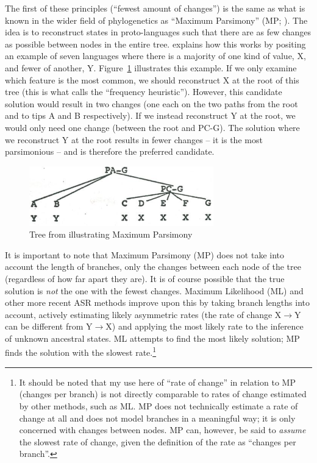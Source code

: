 \documentclass[12pt,letterpaper]{article}
\begin{document}
The first of these principles (``fewest amount of changes'') is the same as what is known in the wider field of phylogenetics as ``Maximum Parsimony'' (MP; \citealt{felsenstein2004inferring}). The idea is to reconstruct states in proto-languages such that there are as few changes as possible between nodes in the entire tree. \citet[17--22]{clark1973aspects} explains how this works by positing an example of seven languages where there is a majority of one kind of value, X, and fewer of another, Y. Figure~\ref{fig:clark_tree} illustrates this example. If we only examine which feature is the most common, we should reconstruct X at the root of this tree (this is what \citealt{goldstein_2022} calls the ``frequency heuristic''). However, this candidate solution would result in two changes (one each on the two paths from the root and to tips A and B respectively). If we instead reconstruct Y at the root, we would only need one change (between the root and PC-G). The solution where we reconstruct Y at the root results in fewer changes -- it is the most parsimonious -- and is therefore the preferred candidate.
 
\begin{figure}[ht]
\centering
\includegraphics[width=8cm]{illustrations/Clark_1977_tree.png}
\caption{{Tree from \citet[19]{clark1973aspects} illustrating Maximum Parsimony}}
\label{fig:clark_tree}
\end{figure}

It is important to note that Maximum Parsimony (MP) does not take into account the length of branches, only the changes between each node of the tree (regardless of how far apart they are). It is of course possible that the true solution is \textit{not} the one with the fewest changes. Maximum Likelihood (ML) and other more recent ASR methods improve upon this by taking branch lengths into account, actively estimating likely asymmetric rates (the rate of change X$\rightarrow$Y can be different from Y$\rightarrow$X) and applying the most likely rate to the inference of unknown ancestral states. ML attempts to find the most likely solution; MP finds the solution with the slowest rate.\footnote{It should be noted that my use here of ``rate of change'' in relation to MP (changes per branch) is not directly comparable to rates of change estimated by other methods, such as ML. MP does not technically estimate a rate of change at all and does not model branches in a meaningful way; it is only concerned with changes between nodes. MP can, however, be said to \textit{assume} the slowest rate of change, given the definition of the rate as ``changes per branch''.}
\end{document}

